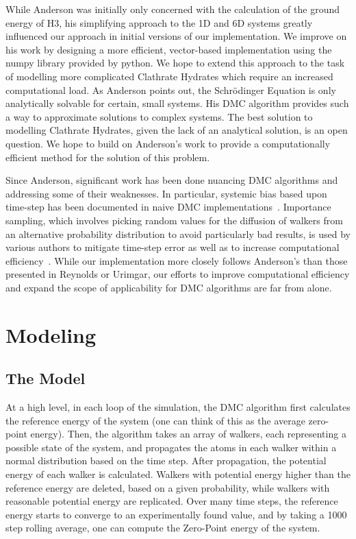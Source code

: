 \documentclass[journal=jacsat,manuscript=article]{achemso}
\begin{document}
While Anderson was initially only concerned with the calculation of the ground energy of H3, his simplifying approach to the 1D and 6D systems greatly influenced our approach in initial versions of our implementation. We improve on his work by designing a more efficient, vector-based implementation using the numpy library provided by python. We hope to extend this approach to the task of modelling more complicated Clathrate Hydrates which require an increased computational load.
As Anderson points out, the Schr\"odinger Equation is only analytically solvable for certain, small systems. His DMC algorithm provides such a way to approximate solutions to complex systems. The best solution to modelling Clathrate Hydrates, given the lack of an analytical solution, is an open question. We hope to build on Anderson's work to provide a computationally efficient method for the solution of this problem.

Since Anderson, significant work has been done nuancing DMC algorithms and addressing some of their weaknesses. In particular, systemic bias based upon time-step has been documented in naive DMC implementations~\cite{Urimgar1993}. Importance sampling, which involves picking random values for the diffusion of walkers from an alternative probability distribution to avoid particularly bad results, is used by various authors to mitigate time-step error as well as to increase computational efficiency~\cite{Reynolds1982,Urimgar1993}. While our implementation more closely follows Anderson's than those presented in Reynolds or Urimgar, our efforts to improve computational efficiency and expand the scope of applicability for DMC algorithms are far from alone.
\section{Modeling}
\subsection{The Model}
At a high level, in each loop of the simulation, the DMC algorithm first calculates the reference energy of the system (one can think of this as the average zero-point energy). Then, the algorithm takes an array of walkers, each representing a possible state of the system, and propagates the atoms in each walker within a normal distribution based on the time step. After propagation, the potential energy of each walker is calculated. Walkers with potential energy higher than the reference energy are deleted, based on a given probability, while walkers with reasonable potential energy are replicated. Over many time steps, the reference energy starts to converge to an experimentally found value, and by taking a 1000 step rolling average, one can compute the Zero-Point energy of the system. 
\end{document}
